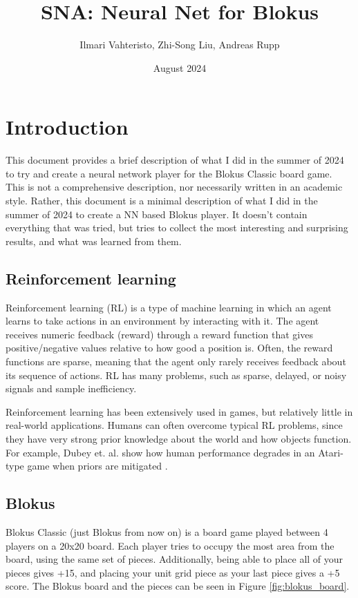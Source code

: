 \documentclass{article}
\title{SNA: Neural Net for Blokus}
\author{Ilmari Vahteristo, Zhi-Song Liu, Andreas Rupp}
\date{August 2024}
\begin{document}
\maketitle

\section{Introduction}
This document provides a brief description of what I did in the summer of 2024 to try and create a neural network player for the Blokus Classic board game. This is not a comprehensive description, nor necessarily written in an academic style. Rather, this document is a minimal description of what I did in the summer of 2024 to create a NN based Blokus player. It doesn't contain everything that was tried, but tries to collect the most interesting and surprising results, and what was learned from them.

\subsection{Reinforcement learning}
Reinforcement learning (RL) is a type of machine learning in which an agent learns to take actions in an environment by interacting with it. The agent receives numeric feedback (reward) through a reward function that gives positive/negative values relative to how good a position is. Often, the reward functions are sparse, meaning that the agent only rarely receives feedback about its sequence of actions. RL has many problems, such as sparse, delayed, or noisy signals and sample inefficiency.


Reinforcement learning has been extensively used in games, but relatively little in real-world applications. Humans can often overcome typical RL problems, since they have very strong prior knowledge about the world and how objects function. For example, Dubey et. al. show how human performance degrades in an Atari-type game when priors are mitigated \cite{dubey2018investigating}.



\subsection{Blokus}
Blokus Classic (just Blokus from now on) is a board game played between 4 players on a 20x20 board. Each player tries to occupy the most area from the board, using the same set of pieces. Additionally, being able to place all of your pieces gives +15, and placing your unit grid piece as your last piece gives a +5 score. The Blokus board and the pieces can be seen in Figure \ref{fig:blokus_board}.
\end{document}
